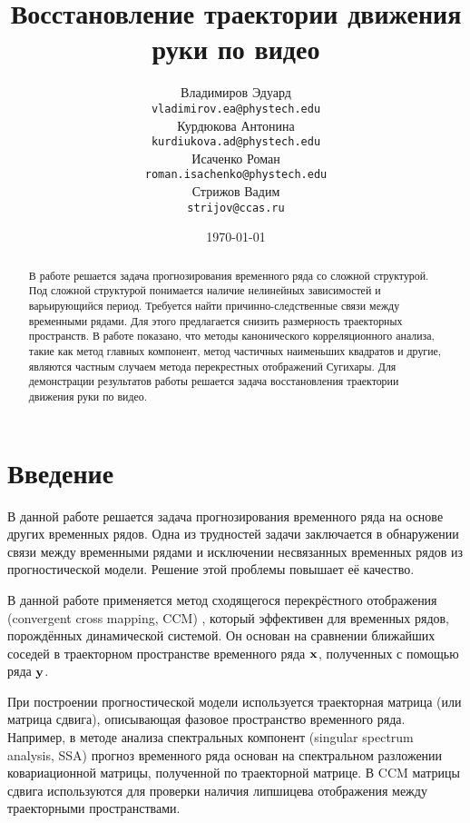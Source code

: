 \documentclass[a4paper, 12pt]{article}
\title{Восстановление траектории движения руки по видео}
\author{Владимиров Эдуард \\
	\texttt{vladimirov.ea@phystech.edu} \\
	
	\And
	Курдюкова Антонина \\
	\texttt{kurdiukova.ad@phystech.edu} \\

	\And
	Исаченко Роман \\
	\texttt{roman.isachenko@phystech.edu} \\
	
	\And
	Стрижов Вадим \\
	\texttt{strijov@ccas.ru}
}
\date{\today}
\begin{document}
\maketitle

\begin{abstract}
	В работе решается задача прогнозирования временного ряда со сложной структурой. Под сложной структурой понимается наличие нелинейных зависимостей и варьирующийся период. Требуется найти причинно-следственные связи между временными рядами. Для этого предлагается снизить размерность траекторных пространств. В работе показано, что методы канонического корреляционного анализа, такие как метод главных компонент, метод частичных наименьших квадратов и другие, являются частным случаем метода перекрестных отображений Сугихары. Для демонстрации результатов работы решается задача восстановления траектории движения руки по видео.
\end{abstract}



\section{Введение}

В данной работе решается задача прогнозирования временного ряда на основе других временных рядов. 
Одна из трудностей задачи заключается в обнаружении связи между временными рядами и исключении несвязанных временных рядов из прогностической модели. 
Решение этой проблемы повышает её качество.

В данной работе применяется метод сходящегося перекрёстного отображения (convergent cross mapping, CCM) \citep{Sugihara90, sugihara1990nonlinear}, который эффективен для временных рядов, порождённых динамической системой. 
Он основан на сравнении ближайших соседей в траекторном пространстве временного ряда $\mathbf{x}$, полученных с помощью ряда $\mathbf{y}$.

При построении прогностической модели используется траекторная матрица (или матрица сдвига), описывающая фазовое пространство временного ряда. 
Например, в методе анализа спектральных компонент (singular spectrum analysis, SSA) \citep{golyandina2005ssa, golyandina2001analysis, zhigljavsky2010singular} прогноз временного ряда основан на спектральном разложении ковариационной матрицы, полученной по траекторной матрице. 
В CCM матрицы сдвига используются для проверки наличия липшицева отображения между траекторными пространствами.
\end{document}
